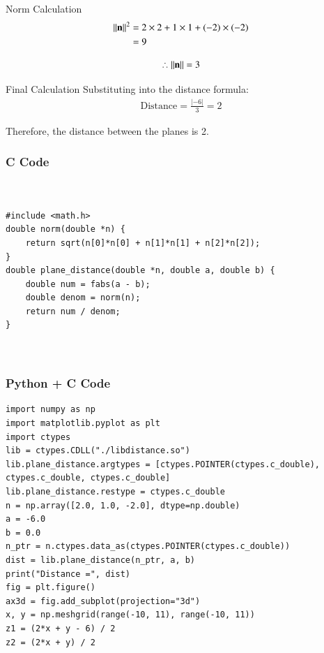 \documentclass{beamer}
\begin{document}
\begin{frame}{Norm Calculation}
\begin{align}
\left\lVert\mathbf{n}\right\rVert^2 &= 2 \times 2 + 1 \times 1 + (-2)\times(-2) \\
&= 9
\end{align}

\begin{align}
\therefore \left\lVert\mathbf{n}\right\rVert = 3
\end{align}
\end{frame}

\begin{frame}{Final Calculation}
Substituting into the distance formula:
\begin{align}
\text{Distance} = \frac{|-6|}{3} = 2
\end{align}

Therefore, the distance between the planes is 2.
\end{frame}

\begin{frame}[fragile]
    \frametitle{C Code }

    \begin{lstlisting}


#include <math.h>
double norm(double *n) {
    return sqrt(n[0]*n[0] + n[1]*n[1] + n[2]*n[2]);
}
double plane_distance(double *n, double a, double b) {
    double num = fabs(a - b);
    double denom = norm(n);
    return num / denom;
}



    \end{lstlisting}
\end{frame}

\begin{frame}[fragile]
    \frametitle{Python + C Code }

    \begin{lstlisting}
import numpy as np
import matplotlib.pyplot as plt
import ctypes
lib = ctypes.CDLL("./libdistance.so")
lib.plane_distance.argtypes = [ctypes.POINTER(ctypes.c_double), ctypes.c_double, ctypes.c_double]
lib.plane_distance.restype = ctypes.c_double
n = np.array([2.0, 1.0, -2.0], dtype=np.double)
a = -6.0
b = 0.0
n_ptr = n.ctypes.data_as(ctypes.POINTER(ctypes.c_double))
dist = lib.plane_distance(n_ptr, a, b)
print("Distance =", dist)
fig = plt.figure()
ax3d = fig.add_subplot(projection="3d")
x, y = np.meshgrid(range(-10, 11), range(-10, 11))
z1 = (2*x + y - 6) / 2
z2 = (2*x + y) / 2

    \end{lstlisting}
\end{frame}
\end{document}
